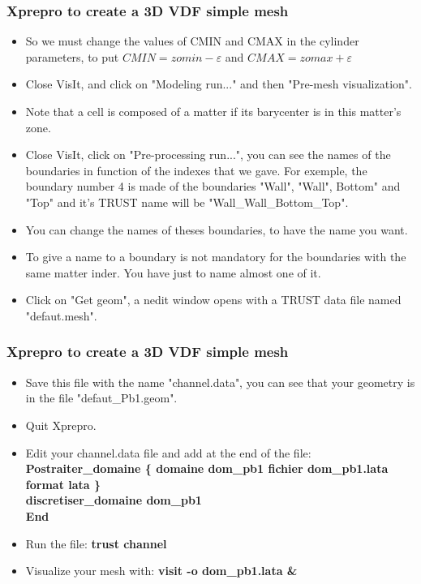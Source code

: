 \documentclass[10pt]{beamer}
\begin{document}
\begin{frame}
\frametitle{Xprepro to create a 3D VDF simple mesh}
\begin{block}{}

\begin{itemize}
\item So we must change the values of CMIN and CMAX in the cylinder parameters, to put $CMIN=zomin-\varepsilon$ and $CMAX=zomax+\varepsilon$
\item Close VisIt, and click on "Modeling run..." and then "Pre-mesh visualization".
\item Note that a cell is composed of a matter if its barycenter is in this matter's zone.
\item Close VisIt, click on "Pre-processing run...", you can see the names of the boundaries in function of the indexes that we gave. For exemple, the boundary number 4 is made of the boundaries "Wall", "Wall", Bottom" and "Top" and it's TRUST name will be "Wall\_Wall\_Bottom\_Top".
\item You can change the names of theses boundaries, to have the name you want.
\item To give a name to a boundary is not mandatory for the boundaries with the same matter inder. You have just to name almost one of it.
\item Click on "Get geom", a nedit window opens with a TRUST data file named "defaut.mesh".
\end{itemize}

\end{block}
\end{frame}
\begin{frame}
\frametitle{Xprepro to create a 3D VDF simple mesh}
\begin{block}{}

\begin{itemize}
\item Save this file with the name "channel.data", you can see that your geometry is in the file "defaut\_Pb1.geom".
\item Quit Xprepro.
\item Edit your channel.data file and add at the end of the file: \\
{\small{
\textbf{Postraiter\_domaine \{ domaine dom\_pb1 fichier dom\_pb1.lata format lata \} \\
discretiser\_domaine dom\_pb1 \\
End }
}}
\item Run the file: \textbf{trust channel}
\item Visualize your mesh with: \textbf{visit -o dom\_pb1.lata \& }
\end{itemize}

\end{block}
\end{frame}
\end{document}
